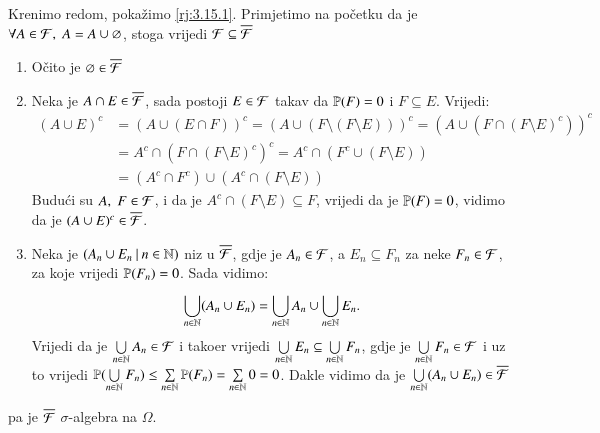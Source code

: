 \begin{rj}
    Krenimo redom, poka\v zimo \ref{rj:3.15.1}.
    Primjetimo na po\v cetku da je $\forall A \in \mathcal{F}, \; A = A \cup \varnothing$, stoga vrijedi $\mathcal{F} \subseteq \overline{\mathcal{F}}$
    \begin{enumerate}[label=(\roman*)]
        \item O\v cito je $\varnothing \in \overline{\mathcal{F}}$
        \item Neka je $A \cap E \in \overline{\mathcal{F}}$, sada postoji $E \in \mathcal{F}$ takav da $\mathbb{P}({F}) = 0$ i $F \subseteq E$.
        Vrijedi:
        \begin{equation*}
            \begin{aligned}
                (A \cup E)^c &= (A \cup (E \cap F))^c = (A \cup (F \setminus (F \setminus E)))^c = (A \cup (F \cap (F \setminus E)^c))^c\\
                &= A^c \cap (F \cap (F \setminus E)^c)^c = A^c \cap (F^c \cup (F \setminus E))\\
                &= (A^c \cap F^c) \cup (A^c \cap (F \setminus E))
            \end{aligned}
        \end{equation*}
        Budu\' ci su $A, \; F \in \mathcal{F}$, i da je $A^c \cap (F \setminus E) \subseteq F$, vrijedi da je $\mathbb{P}({F}) = 0$, vidimo da je $(A \cup E)^c \in \overline{\mathcal{F}}$.
        \item Neka je $({A_n \cup E_n} \: | \: {n \in \mathbb{N}})$ niz u $\overline{\mathcal{F}}$, gdje je $A_n \in \mathcal{F}$, a $E_n \subseteq F_n$ za neke $F_n \in \mathcal{F}$, za koje vrijedi $\mathbb{P}({F_n}) = 0$.
        Sada vidimo:
        \begin{equation*}
            \bigcup\limits_{n \in \mathbb{N}}^{} (A_n \cup E_n) = \bigcup\limits_{n \in \mathbb{N}}^{} A_n \cup \bigcup\limits_{n \in \mathbb{N}}^{} E_n.
        \end{equation*}
        Vrijedi da je $\bigcup\limits_{n \in \mathbb{N}}^{} A_n \in \mathcal{F}$ i tako\dj er vrijedi $\bigcup\limits_{n \in \mathbb{N}}^{} E_n \subseteq \bigcup\limits_{n \in \mathbb{N}}^{} F_n$, gdje je $\bigcup\limits_{n \in \mathbb{N}}^{} F_n \in \mathcal{F}$ i uz to vrijedi $\mathbb{P}({\bigcup\limits_{n \in \mathbb{N}}^{} F_n}) \leq \sum\limits_{n \in \mathbb{N}}^{} \mathbb{P}({F_n}) = \sum\limits_{n \in \mathbb{N}}^{} 0 = 0$.
        Dakle vidimo da je $\bigcup\limits_{n \in \mathbb{N}}^{} (A_n \cup E_n) \in \overline{\mathcal{F}}$
    \end{enumerate}
    pa je $\overline{\mathcal{F}}$ $\sigma$-algebra na $\Omega$.


\end{rj}

